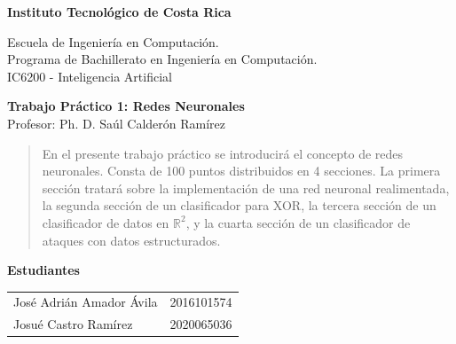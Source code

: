 \documentclass{article}
\begin{document}
\begin{doublespace}
    \begin{center}
        \Large{\textbf{Instituto Tecnológico de Costa Rica}}
        \bigskip\par\end{center}

    \begin{center}
        Escuela de Ingeniería en Computación.\\
        Programa de Bachillerato en Ingeniería en Computación. \\
        IC6200 - Inteligencia Artificial
        \bigskip\par\end{center}

    \begin{center}
        \Large{\textbf{Trabajo Práctico 1: Redes Neuronales}}\\
        Profesor: Ph. D. Saúl Calderón Ramírez
        \par\end{center}
\end{doublespace}

\begin{doublespace}
    \begin{center}
        \begin{abstract}
            En el presente trabajo práctico se introducirá el concepto de redes neuronales. Consta de 100 puntos distribuidos en 4 secciones. La primera sección tratará sobre la implementación de una red neuronal realimentada, la segunda sección de un clasificador para XOR, la tercera sección de un clasificador de datos en $\mathbb{R}^2$, y la cuarta sección de un clasificador de ataques con datos estructurados.
        \end{abstract}
        \par\end{center}
\end{doublespace}

\begin{center}
    \textbf{Estudiantes} \bigskip{} \\
    \begin{table}[h]
        \begin{center}
            \begin{tabular}{@{}lc@{}}
                José Adrián Amador Ávila    & 2016101574   \\
                Josué Castro Ramírez   & 2020065036 
            \end{tabular}
        \end{center}
    \end{table}
    \vfill{}
    \par\end{center}
\end{document}
